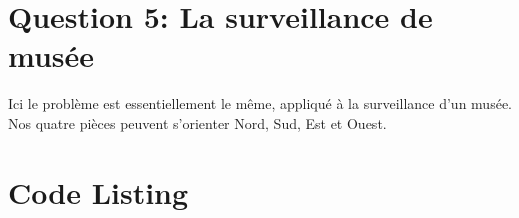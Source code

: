 \documentclass[letterpaper]{article}
\begin{document}
\section{Question 5: La surveillance de musée}

Ici le problème est essentiellement le même, appliqué à la
surveillance d'un musée. Nos quatre pièces peuvent s'orienter Nord,
Sud, Est et Ouest.


\appendix

\section{Code Listing}


\newpage

\newpage

\newpage

\newpage

\newpage

\end{document}
